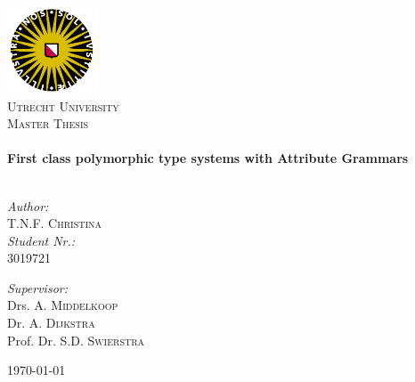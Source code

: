 \begin{titlepage}
 
\begin{center}
 

 \includegraphics[width=0.20\textwidth]{./uu_logo}\\[1cm] 

\textsc{\LARGE Utrecht University}\\[1.5cm]
 
\textsc{\Large Master Thesis}\\[0.5cm]
 

 \HRule \\[0.4cm]
 { \huge \bfseries First class polymorphic type systems with Attribute Grammars}\\[0.4cm]
 
\HRule \\[1.5cm]
 
 \begin{minipage}{0.4\textwidth}
 \begin{flushleft} \large
 \emph{Author:}\\
 T.N.F. \textsc{Christina} \\
 \emph{Student Nr.:} \\
 3019721
 \end{flushleft}
 \end{minipage}
 \begin{minipage}{0.5\textwidth}
 \begin{flushright} \large
 \emph{Supervisor:} \\
 Drs. A. \textsc{Middelkoop} \\
 Dr. A. \textsc{Dijkstra} \\
 Prof. Dr. S.D. \textsc{Swierstra}
 \end{flushright}
 \end{minipage}
 
\vfill
\vfill
 
 {\large \today}
 
\end{center}
 
\end{titlepage}
